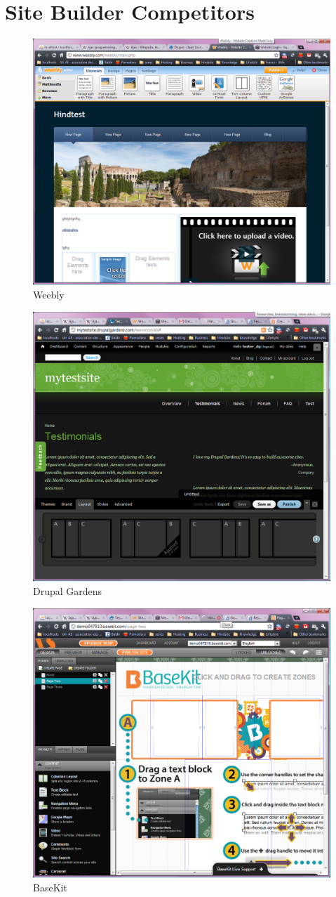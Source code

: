 \chapter{Site Builder Competitors}\label{annexe:ews-competitors}
\begin{figure}[!ht]
\centering
\includegraphics[width=.70\textwidth]{img/weebly.png}
\caption{Weebly}
\label{figure:weebly}
\end{figure}

\begin{figure}[!ht]
\centering
\includegraphics[width=.70\textwidth]{img/drupal_gardens.png}
\caption{Drupal Gardens}
\label{figure:drupal_gardens}
\end{figure}

\begin{figure}[!ht]
\centering
\includegraphics[width=.70\textwidth]{img/basekit.png}
\caption{BaseKit}
\label{figure:basekit}
\end{figure}

